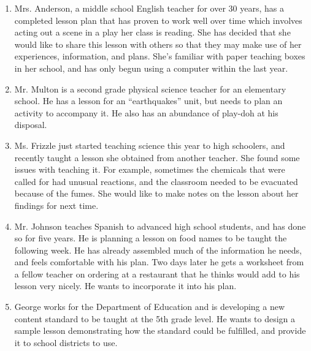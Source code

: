 \begin{enumerate}
\item Mrs. Anderson, a middle school English teacher for over 30 years, has a
completed lesson plan that has proven to work well over time which involves
acting out a scene in a play her class is reading. She has decided that she
would like to share this lesson with others so that they may make use of her
experiences, information, and plans.  She's familiar with paper teaching boxes
in her school, and has only begun using a computer within the last year.

\item Mr.  Multon is a second grade physical science teacher for an elementary
school. He has a lesson for an ``earthquakes'' unit, but needs to plan an
activity to accompany it.  He also has an abundance of play-doh at his disposal.

\item Ms. Frizzle just started teaching science this year to high schoolers,
and recently taught a lesson she obtained from another teacher. She found some
issues with teaching it.  For example, sometimes the chemicals that were called
for had unusual reactions, and the classroom needed to be evacuated because of
the fumes.  She would like to make notes on the lesson about her findings for
next time.

\item Mr. Johnson teaches Spanish to advanced high school students, and has done
so for five years. He is planning a lesson on food names to be taught the
following week. He has already assembled much of the information he needs, and
feels comfortable with his plan.  Two days later he gets a worksheet from a
fellow teacher on ordering at a restaurant that he thinks would add to his
lesson very nicely. He wants to incorporate it into his plan.

\item George works for the Department of Education and is developing a new
content standard to be taught at the 5th grade level. He wants to design a
sample lesson demonstrating how the standard could be fulfilled, and provide it
to school districts to use.

\end{enumerate}

